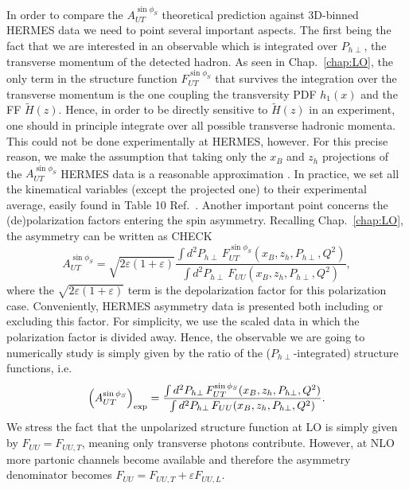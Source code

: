 In order to compare the $A_{UT}^{\sin\phi_S}$ theoretical prediction against 3D-binned HERMES data we need to point several important aspects. The first being the fact that we are interested in an observable which is integrated over $P_{h\perp}$, the transverse momentum of the detected hadron. As seen in Chap.~\ref{chap:LO}, the only term in the structure function $F_{UT}^{\sin\phi_S}$ that survives the integration over the transverse momentum is the one coupling the transversity PDF $h_1(x)$ and the FF $\tilde{H}(z)$. Hence, in order to be directly sensitive to $\tilde{H}(z)$ in an experiment, one should in principle integrate over all possible transverse hadronic momenta. This could not be done experimentally at HERMES, however. For this precise reason, we make the assumption that taking only the $x_B$ and $z_h$ projections of the $A_{UT}^{\sin\phi_S}$ HERMES data is a reasonable approximation \cite{Gamberg2022Htilde}. In practice, we set all the kinematical variables (except the projected one) to their experimental average, easily found in Table 10 Ref.~\cite{hermescollaboration2020azimuthalsingledoublespinasymmetries}. Another important point concerns the (de)polarization factors entering the spin asymmetry. Recalling Chap.~\ref{chap:LO},  the asymmetry can be written as CHECK
\begin{equation}
    A_{UT}^{\sin\phi_S} = \sqrt{2\varepsilon(1+\varepsilon)}\frac{\int d^2P_{h\perp}\,F_{UT}^{\sin\phi_S}(x_B,z_h,P_{h\perp},Q^2)}{\int d^2P_{h\perp}\, F_{UU}(x_B,z_h,P_{h\perp},Q^2)},
\end{equation}
where the $ \sqrt{2\varepsilon(1+\varepsilon)}$ term is the depolarization factor for this polarization case. Conveniently, HERMES asymmetry data is presented both including or excluding this factor. For simplicity, we use the scaled data in which the polarization factor is divided away. Hence, the observable we are going to numerically study is simply given by the ratio of the ($P_{h\perp}$-integrated) structure functions, i.e.
\begin{equation}
    \left(A_{UT}^{\sin\phi_S}\right)_{\rm exp} =\frac{\int d^2P_{h\perp}\,F_{UT}^{\sin\phi_S}(x_B,z_h,P_{h\perp},Q^2)}{\int d^2P_{h\perp}\, F_{UU}(x_B,z_h,P_{h\perp},Q^2)}.
\end{equation}
We stress the fact that the unpolarized structure function at LO is simply given by $F_{UU}=F_{UU,T}$, meaning only transverse photons contribute. However, at NLO more partonic channels become available and therefore the asymmetry denominator becomes $F_{UU}=F_{UU,T}+\varepsilon F_{UU,L}$.\\
